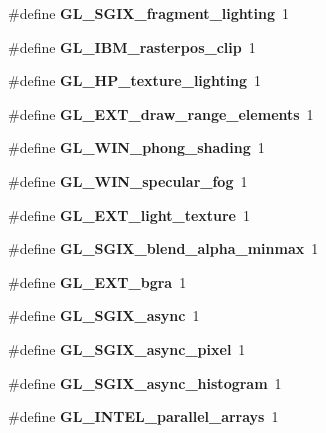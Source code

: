 \begin{DoxyCompactItemize}
\item 
\#define {\bfseries G\+L\+\_\+\+S\+G\+I\+X\+\_\+fragment\+\_\+lighting}~1\label{_s_d_l__opengl_8h_a2c727ca12944f964ea445893187bd6ec}

\item 
\#define {\bfseries G\+L\+\_\+\+I\+B\+M\+\_\+rasterpos\+\_\+clip}~1\label{_s_d_l__opengl_8h_a3cd70bac291cb3a155bff2a4b27ecd1f}

\item 
\#define {\bfseries G\+L\+\_\+\+H\+P\+\_\+texture\+\_\+lighting}~1\label{_s_d_l__opengl_8h_aaec6561e8c0a363b93350b6a140462c7}

\item 
\#define {\bfseries G\+L\+\_\+\+E\+X\+T\+\_\+draw\+\_\+range\+\_\+elements}~1\label{_s_d_l__opengl_8h_a09cb31ca41911d25f0a7726736e4501f}

\item 
\#define {\bfseries G\+L\+\_\+\+W\+I\+N\+\_\+phong\+\_\+shading}~1\label{_s_d_l__opengl_8h_a065f2015180040ab6e728fb8050543f8}

\item 
\#define {\bfseries G\+L\+\_\+\+W\+I\+N\+\_\+specular\+\_\+fog}~1\label{_s_d_l__opengl_8h_a0875cc3370a5f02d9078b6a8061fc34e}

\item 
\#define {\bfseries G\+L\+\_\+\+E\+X\+T\+\_\+light\+\_\+texture}~1\label{_s_d_l__opengl_8h_a8e266c9ccc06e601b0ebb6c2d1435467}

\item 
\#define {\bfseries G\+L\+\_\+\+S\+G\+I\+X\+\_\+blend\+\_\+alpha\+\_\+minmax}~1\label{_s_d_l__opengl_8h_a6db2277cb1ed2327477df68bdd958bc6}

\item 
\#define {\bfseries G\+L\+\_\+\+E\+X\+T\+\_\+bgra}~1\label{_s_d_l__opengl_8h_aee41999b057c9eab5bf7d0d31588270d}

\item 
\#define {\bfseries G\+L\+\_\+\+S\+G\+I\+X\+\_\+async}~1\label{_s_d_l__opengl_8h_a521f14c7e1809b5f8079d730102da0a3}

\item 
\#define {\bfseries G\+L\+\_\+\+S\+G\+I\+X\+\_\+async\+\_\+pixel}~1\label{_s_d_l__opengl_8h_a5ef1dc9d7ede2e27ffa18c6f9f523664}

\item 
\#define {\bfseries G\+L\+\_\+\+S\+G\+I\+X\+\_\+async\+\_\+histogram}~1\label{_s_d_l__opengl_8h_a3d1b344d29f67dbfe063fe5ddbd8094a}

\item 
\#define {\bfseries G\+L\+\_\+\+I\+N\+T\+E\+L\+\_\+parallel\+\_\+arrays}~1\label{_s_d_l__opengl_8h_a5548296ff6ada6a4c1d1b9440670401e}


\end{DoxyCompactItemize}
